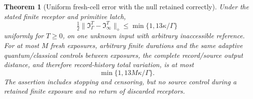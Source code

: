 \documentclass[11pt,oneside,openany]{book}
\newtheorem{theorem}{Theorem}[chapter]
\theoremstyle{definition}
\theoremstyle{remark}\newtheorem{remark}[theorem]{Remark}
\begin{document}
\begin{theorem}[Uniform fresh-cell error with the null retained correctly]
\label{det:thirteen}
Under the stated finite receptor and primitive latch,
\begin{equation}
 \tfrac12\|\mathfrak I_\Gamma^T-
                   \mathfrak I_\infty^T\|_\diamond
       \le\min\{1,13\kappa/\Gamma\}             \label{det:thirteen-bound}
\end{equation}
uniformly for $T\ge0$, on one unknown input with arbitrary inaccessible
reference. For at most $M$ fresh exposures, arbitrary finite durations
and the same adaptive quantum/classical controls between exposures,
the complete record/source output distance, and therefore record-history
total variation, is at most
\begin{equation}
 \min\{1,13M\kappa/\Gamma\}.                  \label{det:thirteen-network}
\end{equation}
The assertion includes stopping and censoring, but no source control
during a retained finite exposure and no return of discarded receptors.
\end{theorem}
\end{document}
